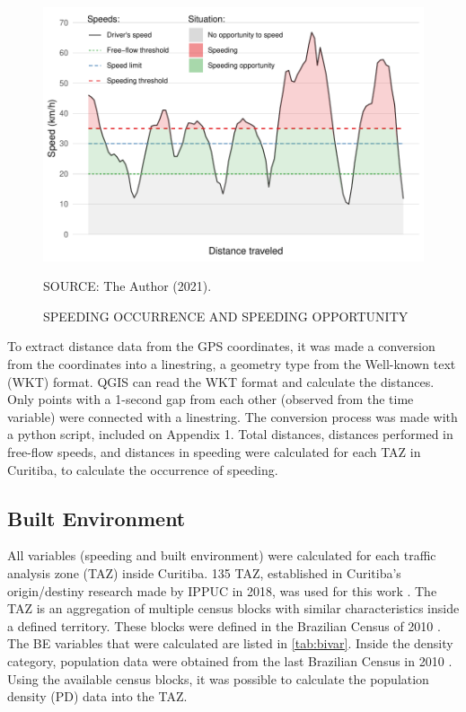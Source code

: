 \begin{figure}[!htbp]
    \centering\footnotesize
    \captionsetup{font=footnotesize}
    \caption{SPEEDING OCCURRENCE AND SPEEDING OPPORTUNITY}
    \includegraphics{fig/spd_occur.pdf}
    \label{fig:spd_occur}
    \par SOURCE: The Author (2021).
\end{figure}


To extract distance data from the GPS coordinates, it was made a conversion from the coordinates into a linestring, a geometry type from the Well-known text (WKT) format. QGIS can read the WKT format and calculate the distances. Only points with a 1-second gap from each other (observed from the time variable) were connected with a linestring. The conversion process was made with a python script, included on Appendix 1. Total distances, distances performed in free-flow speeds, and distances in speeding were calculated for each TAZ in Curitiba, to calculate the occurrence of speeding. 

\subsection{Built Environment} \label{sub:be}




All variables (speeding and built environment) were calculated for each traffic analysis zone (TAZ) inside Curitiba. 135 TAZ, established in Curitiba's origin/destiny research made by IPPUC in 2018, was used for this work \cite{IPPUC2018b}. The TAZ is an aggregation of multiple census blocks with similar characteristics inside a defined territory. These blocks were defined in the Brazilian Census of 2010 \cite{IBGE2010}. The BE variables that were calculated are listed in \autoref{tab:bivar}. Inside the density category, population data were obtained from the last Brazilian Census in 2010 \cite{IBGE2010}. Using the available census blocks, it was possible to calculate the population density (PD) data into the TAZ. 


